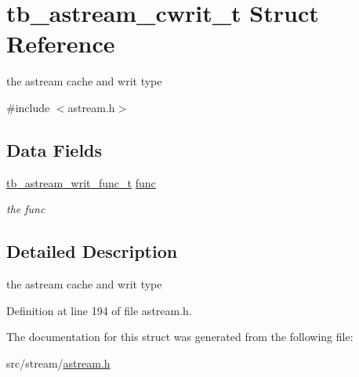 \hypertarget{structtb__astream__cwrit__t}{\section{tb\-\_\-astream\-\_\-cwrit\-\_\-t Struct Reference}
\label{structtb__astream__cwrit__t}
}


the astream cache and writ type  




{\ttfamily \#include $<$astream.\-h$>$}

\subsection*{Data Fields}
\begin{DoxyCompactItemize}
\item 
\hypertarget{structtb__astream__cwrit__t_a273e07370cb8b31be53098163ba42793}{\hyperlink{astream_8h_afbb9676c016d2e631bf4bc06836f4a45}{tb\-\_\-astream\-\_\-writ\-\_\-func\-\_\-t} \hyperlink{structtb__astream__cwrit__t_a273e07370cb8b31be53098163ba42793}{func}}\label{structtb__astream__cwrit__t_a273e07370cb8b31be53098163ba42793}

\begin{DoxyCompactList}\small\item\em the func \end{DoxyCompactList}\end{DoxyCompactItemize}


\subsection{Detailed Description}
the astream cache and writ type 

Definition at line 194 of file astream.\-h.



The documentation for this struct was generated from the following file\-:\begin{DoxyCompactItemize}
\item 
src/stream/\hyperlink{astream_8h}{astream.\-h}\end{DoxyCompactItemize}
